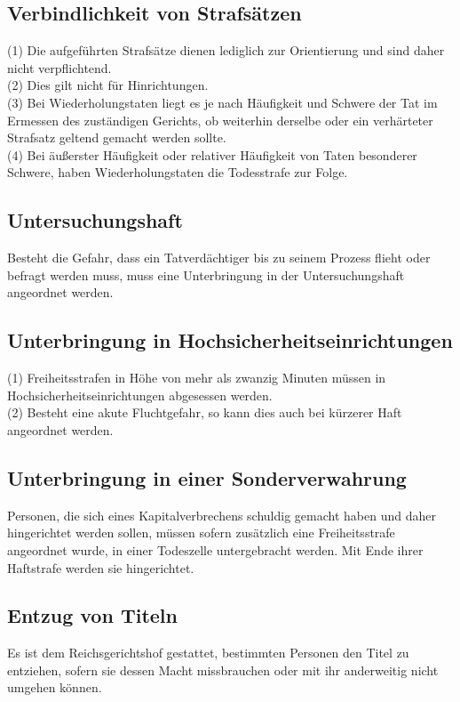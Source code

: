 \documentclass{article}
\begin{document}
\subsection{Verbindlichkeit von Strafsätzen}
(1) Die aufgeführten Strafsätze dienen lediglich zur Orientierung und sind daher nicht verpflichtend.\\
(2) Dies gilt nicht für Hinrichtungen.\\
(3) Bei Wiederholungstaten liegt es je nach Häufigkeit und Schwere der Tat im Ermessen des zuständigen Gerichts, ob weiterhin derselbe oder ein verhärteter Strafsatz geltend gemacht werden sollte.\\
(4) Bei äußerster Häufigkeit oder relativer Häufigkeit von Taten besonderer Schwere, haben Wiederholungstaten die Todesstrafe zur Folge.

\subsection{Untersuchungshaft}
Besteht die Gefahr, dass ein Tatverdächtiger bis zu seinem Prozess flieht oder befragt werden muss, muss eine Unterbringung in der Untersuchungshaft angeordnet werden.\\

\subsection{Unterbringung in Hochsicherheitseinrichtungen}
(1)	Freiheitsstrafen in Höhe von mehr als zwanzig Minuten müssen in Hochsicherheitseinrichtungen abgesessen werden.\\
(2)	Besteht eine akute Fluchtgefahr, so kann dies auch bei kürzerer Haft angeordnet werden.

\subsection{Unterbringung in einer Sonderverwahrung}
Personen, die sich eines Kapitalverbrechens schuldig gemacht haben und daher hingerichtet werden sollen, müssen sofern zusätzlich eine Freiheitsstrafe angeordnet wurde, in einer Todeszelle untergebracht werden. Mit Ende ihrer Haftstrafe werden sie hingerichtet.

\subsection{Entzug von Titeln}
Es ist dem Reichsgerichtshof gestattet, bestimmten Personen den Titel zu entziehen, sofern sie dessen Macht missbrauchen oder mit ihr anderweitig nicht umgehen können.
\end{document}
